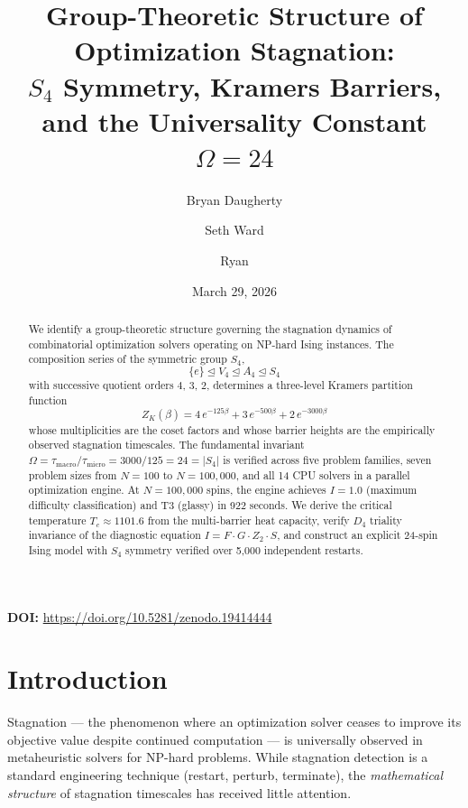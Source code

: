\documentclass[11pt]{amsart}
\title[Group-Theoretic Structure of Optimization Stagnation]{Group-Theoretic Structure of Optimization Stagnation:\\$S_4$ Symmetry, Kramers Barriers, and the Universality Constant $\Omega = 24$}
\author{Bryan Daugherty}
\author{Seth Ward}
\author{Ryan}
\date{March 29, 2026}
\theoremstyle{definition}
\begin{document}
\begin{abstract}
We identify a group-theoretic structure governing the stagnation dynamics of combinatorial optimization solvers operating on NP-hard Ising instances. The composition series of the symmetric group $S_4$,
\[
\{e\} \trianglelefteq V_4 \trianglelefteq A_4 \trianglelefteq S_4
\]
with successive quotient orders $4$, $3$, $2$, determines a three-level Kramers partition function
\[
Z_K(\beta) = 4\,e^{-125\beta} + 3\,e^{-500\beta} + 2\,e^{-3000\beta}
\]
whose multiplicities are the coset factors and whose barrier heights are the empirically observed stagnation timescales. The fundamental invariant $\Omega = \tau_{\mathrm{macro}}/\tau_{\mathrm{micro}} = 3000/125 = 24 = |S_4|$ is verified across five problem families, seven problem sizes from $N = 100$ to $N = 100{,}000$, and all 14 CPU solvers in a parallel optimization engine. At $N = 100{,}000$ spins, the engine achieves $I = 1.0$ (maximum difficulty classification) and T3 (glassy) in 922 seconds. We derive the critical temperature $T_c \approx 1101.6$ from the multi-barrier heat capacity, verify $D_4$ triality invariance of the diagnostic equation $I = F \cdot G \cdot Z_2 \cdot S$, and construct an explicit 24-spin Ising model with $S_4$ symmetry verified over 5{,}000 independent restarts.
\end{abstract}

\vspace{0.5em}
\noindent\textbf{DOI:} \url{https://doi.org/10.5281/zenodo.19414444}

\maketitle
\tableofcontents

\section{Introduction}
\label{sec:intro}

Stagnation --- the phenomenon where an optimization solver ceases to improve its objective value despite continued computation --- is universally observed in metaheuristic solvers for NP-hard problems. While stagnation detection is a standard engineering technique (restart, perturb, terminate), the \emph{mathematical structure} of stagnation timescales has received little attention.
\end{document}
